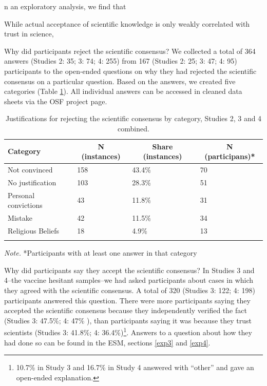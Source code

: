\documentclass[
  doc,floatsintext]{apa6}
\begin{document}
n an exploratory analysis, we find that

While actual acceptance of scientific knowledge is only weakly correlated with trust in science,

Why did participants reject the scientific consensus? We collected a total of 364 answers (Studies 2: 35; 3: 74; 4: 255) from 167 (Studies 2: 25; 3: 47; 4: 95) participants to the open-ended questions on why they had rejected the scientific consensus on a particular question. Based on the answers, we created five categories (Table \ref{tab:justifications}). All individual answers can be accessed in cleaned data sheets via the OSF project page.

\begin{table}[tbp]

\begin{center}
\begin{threeparttable}

\caption{\label{tab:justifications}Justifications for rejecting the scientific consensus by category, Studies 2, 3 and 4 combined.}

\begin{tabular}{llll}
\toprule
Category & \multicolumn{1}{c}{N (instances)} & \multicolumn{1}{c}{Share (instances)} & \multicolumn{1}{c}{N (participans)*}\\
\midrule
Not convinced & 158 & 43.4\% & 70\\
No justification & 103 & 28.3\% & 51\\
Personal convictions & 43 & 11.8\% & 31\\
Mistake & 42 & 11.5\% & 34\\
Religious Beliefs & 18 & 4.9\% & 13\\
\bottomrule
\addlinespace
\end{tabular}

\begin{tablenotes}[para]
\normalsize{\textit{Note.} *Participants with at least one answer in that category}
\end{tablenotes}

\end{threeparttable}
\end{center}

\end{table}

Why did participants say they accept the scientific consensus? In Studies 3 and 4--the vaccine hesitant samples--we had asked participants about cases in which they agreed with the scientific consensus. A total of 320 (Studies 3: 122; 4: 198) participants answered this question. There were more participants saying they accepted the scientific consensus because they independently verified the fact (Studies 3: 47.5\%; 4: 47\% ), than participants saying it was because they trust scientists (Studies 3: 41.8\%; 4: 36.4\%)\footnote{10.7\% in Study 3 and 16.7\% in Study 4 answered with ``other'' and gave an open-ended explanation.}. Answers to a question about how they had done so can be found in the ESM, sections \ref{exp3} and \ref{exp4}.
\end{document}
